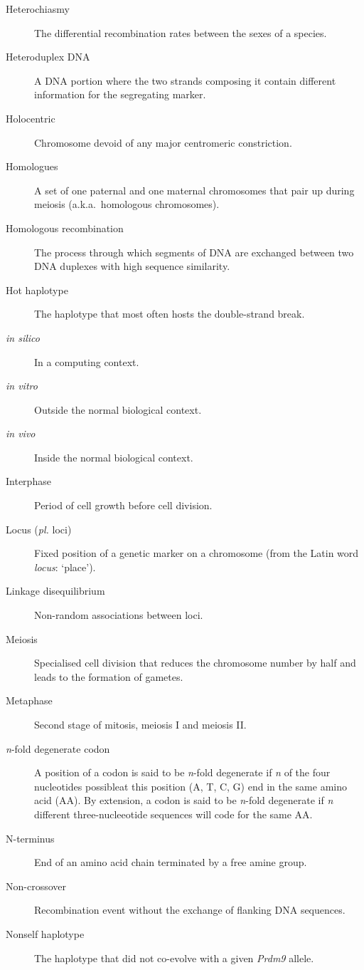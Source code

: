 \begin{alwayssingle}
\begin{description}
		\item[Heterochiasmy] The differential recombination rates between the sexes of a species.
		\item[Heteroduplex DNA] A DNA portion where the two strands composing it contain different information for the segregating marker.
		\item[Holocentric] Chromosome devoid of any major centromeric constriction. 
		\item[Homologues] A set of one paternal and one maternal chromosomes that pair up during meiosis (a.k.a.\ homologous chromosomes).
		\item[Homologous recombination] The process through which segments of DNA are exchanged between two DNA duplexes with high sequence similarity.
		\item[Hot haplotype] The haplotype that most often hosts the double-strand break.
		\item[\textit{in silico}] In a computing context.
		\item[\textit{in vitro}] Outside the normal biological context.
		\item[\textit{in vivo}] Inside the normal biological context.
		\item[Interphase] Period of cell growth before cell division.
		\item[Locus (\textit{pl.} loci)] Fixed position of a genetic marker on a chromosome (from the Latin word \textit{locus}: ‘place’).
		\item[Linkage disequilibrium] Non-random associations between loci.
		\item[Meiosis] Specialised cell division that reduces the chromosome number by half and leads to the formation of gametes.
		\item[Metaphase] Second stage of mitosis, meiosis I and meiosis II\@.
		\item[\textit{n}-fold degenerate codon] A position of a codon is said to be \textit{n}-fold degenerate if \textit{n} of the four nucleotides possibleat this position (A, T, C, G) end in the same amino acid (AA). By extension, a codon is said to be \textit{n}-fold degenerate if \textit{n} different three-nucleeotide sequences will code for the same AA\@.
		\item[N-terminus] End of an amino acid chain terminated by a free amine group.
		\item[Non-crossover] Recombination event without the exchange of flanking DNA sequences.
		\item[Nonself haplotype] The haplotype that did not co-evolve with a given \textit{Prdm9} allele.

\end{description}
\end{alwayssingle}
